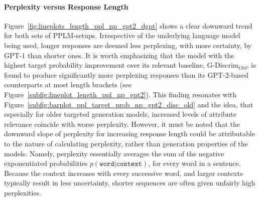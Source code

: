 
\paragraph{Perplexity versus Response Length} Figure~\ref{fig:lineplots_length_ppl_np_gpt2_dgpt} shows a clear downward trend for both sets of PPLM-setups. Irrespective of the underlying language model being used, longer responses are deemed less perplexing, with more certainty, by GPT-1 than shorter ones. It is worth emphasizing that the model with the highest target probability improvement over its relevant baseline, G-Discrim$_{Old}$, is found to produce significantly more perplexing responses than its GPT-2-based counterparts at most length brackets (see Figure~\ref{subfig:lineplot_length_ppl_np_gpt2}). This finding resonates with Figure~\ref{subfig:barplot_ppl_target_prob_np_gpt2_disc_old} and the idea, that especially for older targeted generation models, increased levels of attribute relevance coincide with worse perplexity.
However, it must be noted that the downward slope of perplexity for increasing response length could be attributable to the nature of calculating perplexity, rather than generation properties of the models. Namely, perplexity essentially averages the sum of the negative exponentiated probabilities $p(\texttt{word} | \texttt{context})$, for every word in a sentence. Because the context increases with every successive word, and larger contexts typically result in less uncertainty, shorter sequences are often given unfairly high perplexities.


